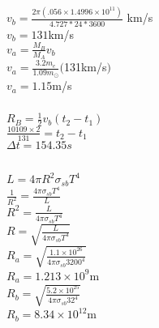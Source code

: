 \documentclass{article}
\begin{document}
\subsubsection{}
\begin{center}
\(v_b = \frac{2\pi (.056 \times 1.4996 \times 10^{11})}{4.727 * 24 * 3600}\) km/s \\

\(v_b = 131\)km/s \\
\vspace{6mm}
\(v_a = \frac{M_B}{M_A}v_b\)\\
\(v_a = \frac{3.2m_e}{1.09m_\odot}(\)131km/s\()\)\\
\(v_a = 1.15\)m/s \\
\end{center}

\subsubsection{}

\begin{center}
    \(R_B = \frac{1}{2} v_b(t_2 - t_1)\)\\
    \(\frac{10109 \times 2 }{131} = t_2 - t_1 \)\\
    \(\Delta t = 154.35s\)
    
\end{center}

\begin{center}
    
\end{center}

\subsection{}
\subsubsection{}
\begin{center}
    \(L = 4\pi R^2\sigma_{sb} T^4\)\\
    \(\frac{1}{R^2} = \frac{4\pi\sigma_{sb} T^4}{L}\) \\
    \({R^2} = \frac{L}{4\pi\sigma_{sb} T^4}\)\\
    \({R} = \sqrt{\frac{L}{4\pi\sigma_{sb} T^4}}\)
    \vspace{5mm} \\
    \(R_a = \sqrt{\frac{1.1 \times 10^{26}}{4\pi \sigma_{sb} 3200^4}}\)\\
    \(R_a = 1.213 \times 10^{9}\)m\\
    \vspace{5mm}
    \(R_b = \sqrt{\frac{5.2 \times 10^{25}}{4\pi \sigma_{sb} 32^4}}\)\\
    \(R_b = 8.34 \times 10^{12}\)m
    \end{center}
\end{document}
